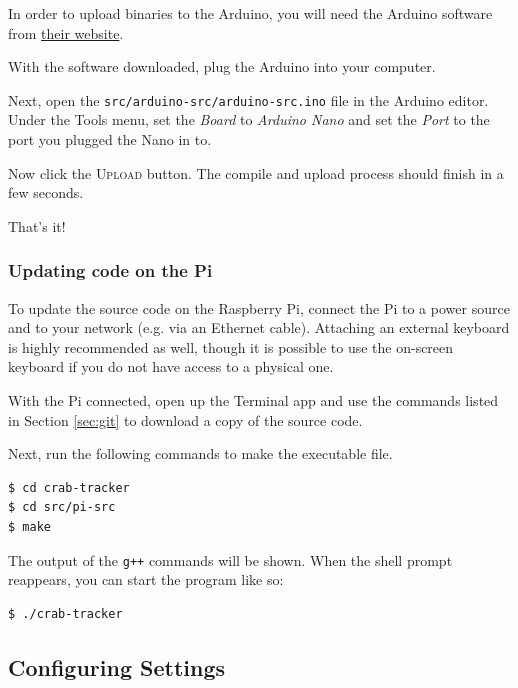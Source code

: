 \documentclass[12pt]{article}
\begin{document}
In order to upload binaries to the Arduino, you will need the Arduino software
from \href{https://www.arduino.cc/en/Main/Software}{their website}.

With the software downloaded, plug the Arduino into your computer.

Next, open the
\texttt{src/arduino-src/arduino-src.ino} file in the Arduino
editor.
Under the Tools menu, set the \textsl{Board} to \textit{Arduino Nano}
and set the \textsl{Port} to the port you plugged the Nano in to.

Now click the \textsc{Upload} button.
The compile and upload process should finish in a few seconds.

That's it!

\subsubsection{Updating code on the Pi}

To update the source code on the Raspberry Pi, connect the Pi to a power source
and to your network (e.g. via an Ethernet cable).
Attaching an external keyboard is highly recommended as well, though it is
possible
to use the on-screen keyboard if you do not have access to a physical one.

With the Pi connected, open up the Terminal app and use the commands listed
in Section \ref{sec:git} to download a copy of the source code.

Next, run the following commands to make the executable file.

\begin{lstlisting}[language=bash]
$ cd crab-tracker
$ cd src/pi-src
$ make
\end{lstlisting}

The output of the \texttt{g++} commands will be shown.
When the shell prompt reappears, you can start the program like so:

\begin{lstlisting}[language=bash]
$ ./crab-tracker
\end{lstlisting}

\subsection{Configuring Settings}
\end{document}
